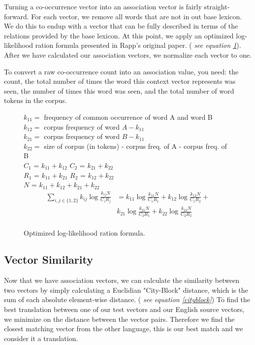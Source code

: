 \documentclass[12pt]{article}
\begin{document}
Turning a co-occurrence vector into an association vector is fairly straight-forward. For each vector, we remove all words that are not in out base lexicon. We do this to endup with a vector that can be fully described in terms of the relations provided by the base lexicon. At this point, we apply an optimized log-likelihood ration formula presented in Rapp's original paper. (\emph{ see equation \ref{loglike}}). After we have calculated our association vectors, we normalize each vector to one.

To convert a raw co-occurrence count into an association value, you need: the count, the total number of times the word this context vector represents was seen, the number of times this word was seen, and the total number of word tokens in the corpus.

\begin{figure}
$k_{11} =$ frequency of common occurrence of word A and word B \\
$k_{12} =$ corpus frequency of word $A - k_{11}$ \\
$k_{21} =$ corpus frequency of word $B - k_{11}$ \\
$k_{22} =$ size of corpus (in tokens) - corpus freq. of A - corpus freq. of B \\

$C_1$ = $k_{11} + k_{12}$ 
$C_2$ = $k_{21} + k_{22}$ \\
$R_1$ = $k_{11} + k_{21}$ 
$R_2$ = $k_{12} + k_{22}$ \\
$N$ = $k_{11} + k_{12} + k_{21} + k_{22}$ \\

  \begin{eqnarray*}
\sum_{i,j\in\{1,2\}} k_{ij}\log\frac{k_{ij}N}{C_iR_j} &= k_{11}\log\frac{k_{11}N}{C_1R_1} +  k_{12}\log\frac{k_{12}N}{C_1R_2} + \\
  & k_{21}\log\frac{k_{21}N}{C_2R_1} +  k_{22}\log\frac{k_{22}N}{C_2R_2} \\
  \end{eqnarray*}

  \caption{Optimized log-likelihood ration formula.}
  \label{loglike}
\end{figure}


\subsection{Vector Similarity}

Now that we have association vectors, we can calculate the similarity between two vectors by simply calculating a Euclidian "City-Block" distance, which is the sum of each absolute element-wise distance. (\emph{ see equation \ref{cityblock}}) To find the best translation between one of our test vectors and our English source vectors, we minimize on the distance between the vector pairs. Therefore we find the closest matching vector from the other language, this is our best match and we consider it a translation.
\end{document}

